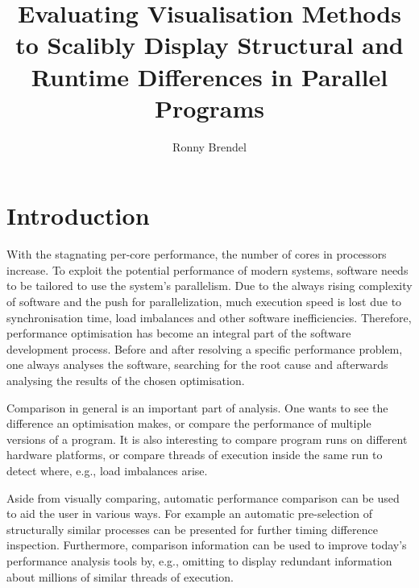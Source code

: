 \documentclass[b5paper, final, hauptseminar]{zih-template}
\author{Ronny Brendel}
\date{\titledate{\today}}
\title{Evaluating Visualisation Methods to Scalibly Display Structural and Runtime Differences in Parallel Programs}
\newcommand*\cleartooddpage{
	\clearpage
	\ifthenelse{\isodd{\thepage}}
		{}
		{\newpage \mbox{} \clearpage}
}
\begin{document}


\cleartooddpage
\section{Introduction}
With the stagnating per-core performance, the number of cores in processors increase.
To exploit the potential performance of modern systems, software needs to be tailored to use the system's parallelism.
Due to the always rising complexity of software and the push for parallelization, much execution speed is lost due to synchronisation time, load imbalances and other software inefficiencies.
Therefore, performance optimisation has become an integral part of the software development process.
Before and after resolving a specific performance problem, one always analyses the software, searching for the root cause and afterwards analysing the results of the chosen optimisation.

Comparison in general is an important part of analysis. One wants to see the difference an optimisation makes, or compare the performance of multiple versions of a program. It is also interesting to compare program runs on different hardware platforms, or compare threads of execution inside the same run to detect where, e.g., load imbalances arise.

Aside from visually comparing, automatic performance comparison can be used to aid the user in various ways.
For example an automatic pre-selection of structurally similar processes can be presented for further timing difference inspection.
Furthermore, comparison information can be used to improve today's performance analysis tools by, e.g., omitting to display redundant information about millions of similar threads of execution.
\end{document}
